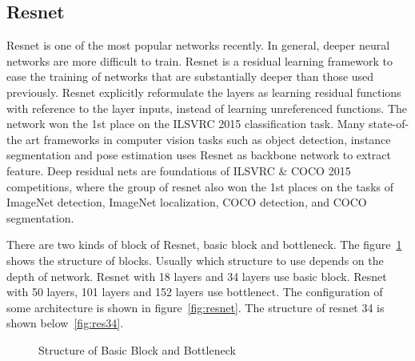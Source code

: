 \documentclass{article}
\begin{document}
\subsection{Resnet}

Resnet\cite{he2016deep} is one of the most popular networks recently. In general, deeper neural networks are more difficult to train. Resnet is a residual learning framework to ease the training
of networks that are substantially deeper than those used
previously. Resnet explicitly reformulate the layers as learning
residual functions with reference to the layer inputs, instead
of learning unreferenced functions. The network won the 1st place on the ILSVRC 2015 classification task. Many state-of-the art frameworks in computer vision tasks such as object detection, instance segmentation and pose estimation uses Resnet as backbone network to extract feature. Deep residual nets are foundations of ILSVRC
\& COCO 2015 competitions, where the group of resnet also won the 1st
places on the tasks of ImageNet detection, ImageNet localization,
COCO detection, and COCO segmentation.

There are two kinds of block of Resnet, basic block and bottleneck. The figure~\ref{fig:basic-block} shows the structure of blocks. Usually which structure to use depends on the depth of network. Resnet with 18 layers and 34 layers use basic block. Resnet with 50 layers, 101 layers and 152 layers use bottlenect. The configuration of some architecture is shown in figure~\ref{fig:resnet}. The structure of resnet 34 is shown below~\ref{fig:res34}.

\begin{figure}[!htb]
	\centering
{}
\caption{Structure of Basic Block and Bottleneck\protect\footnotemark}
\label{fig:basic-block}
\end{figure}
\end{document}
